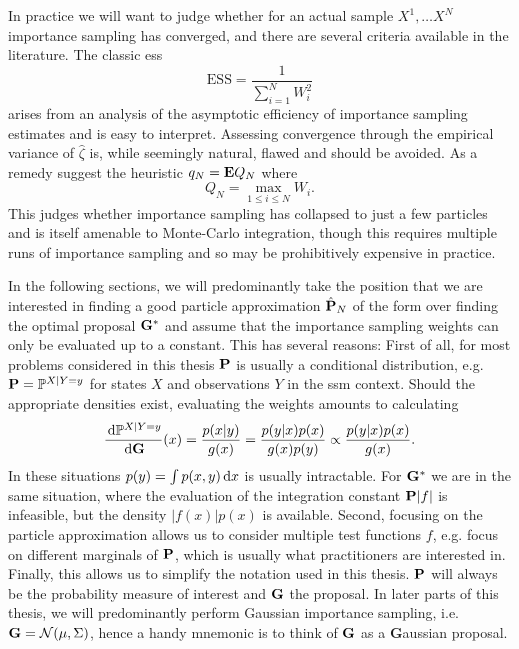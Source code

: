 In practice we will want to judge whether for an actual sample $X^{1}, \dots X^{N}$ importance sampling has converged, and there are several criteria available in the literature. The classic \gls{ess}\citep{Kong1994Sequential} 
$$
\text{ESS} = \frac{1}{\sum_{i = 1}^N W^{2}_{i}}
$$
arises from an analysis of the asymptotic efficiency of importance sampling estimates and is easy to interpret. Assessing convergence through the empirical variance of $\hat \zeta$ is, while seemingly natural, flawed \citep{Chatterjee2018Sample}  and should be avoided. As a remedy \citep{Chatterjee2018Sample} suggest the heuristic $q_{N} = \E Q_{N}$ where
$$
Q_{N} = \max_{1\leq i\leq N} W_{i}.
$$
This judges whether importance sampling has collapsed to just a few particles and is itself amenable to Monte-Carlo integration, though this requires multiple runs of importance sampling and so may be prohibitively expensive in practice.

In the following sections, we will predominantly take the position that we are interested in finding a good particle approximation $\hat\P_{N}$ of the form  over finding the optimal proposal $\G^{\ast}$  and assume that the importance sampling weights can only be evaluated up to a constant. 
This has several reasons: First of all, for most problems considered in this thesis $\P$ is usually a conditional distribution, e.g. $\P = \mathbb P^{X|Y=y}$ for states $X$ and observations $Y$ in the \acrshort{ssm} context. Should the appropriate densities exist, evaluating the weights amounts to calculating 
$$
\rnd{\mathbb P^{X| Y= y}}{\G}(x) = \frac{p(x|y)}{g(x)} = \frac{p(y|x)p(x)}{g(x)p(y)} \propto \frac{p(y|x)p(x)}{g(x)}.
$$
In these situations $p(y) = \int p(x,y)\d x$ is usually intractable. For $\G^{\ast}$ we are in the same situation, where the evaluation of the integration constant $\P \lvert f \rvert$ is infeasible, but the density $\lvert f(x)\rvert p(x)$ is available.
Second, focusing on the particle approximation allows us to consider multiple test functions $f$, e.g. focus on different marginals of $\P$, which is usually what practitioners are interested in. 
Finally, this allows us to simplify the notation used in this thesis. $\P$ will always be the probability measure of interest and $\G$ the proposal. In later parts of this thesis, we will predominantly perform Gaussian importance sampling, i.e. $\G = \mathcal N(\mu, \Sigma)$, hence a handy mnemonic is to think of $\G$ as a \textbf{G}aussian proposal.

